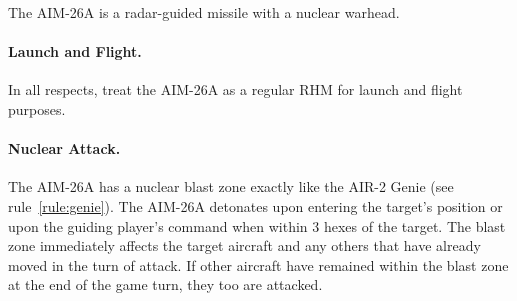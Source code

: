\begin{advancedrules}
{}{

The AIM-26A is a radar-guided missile with a nuclear warhead.

\paragraph{Launch and Flight.} In all respects, treat the AIM-26A as a regular RHM for launch and flight purposes.

\paragraph{Nuclear Attack.} The AIM-26A has a nuclear blast zone exactly like the AIR-2 Genie (see rule~\ref{rule:genie}). The AIM-26A detonates upon entering the target's position or upon the guiding player's command when within 3 hexes of the target. The blast zone immediately affects the target aircraft and any others that have already moved in the turn of attack. If other aircraft have remained within the blast zone at the end of the game turn, they too are attacked.

}
\end{advancedrules}
